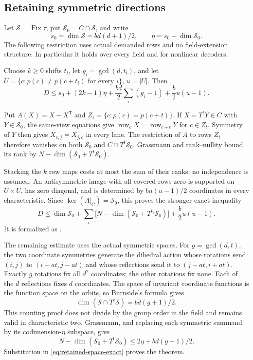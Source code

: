 \subsection{Retaining symmetric directions}

Let $\mathcal S=\operatorname{Fix}\tau$, put
$\mathcal S_0=C\cap\mathcal S$, and write
\[
 s_0=\dim\mathcal S=bd(d+1)/2,\qquad
 \eta=s_0-\dim\mathcal S_0.
\]
The following restriction uses actual demanded rows and no field-extension
structure. In particular it holds over every field and for nonlinear
decoders.

\begin{theorem}\label{thm:pairing-retention}
Choose $k\ge0$ shifts $t_i$, let $g_i=\gcd(d,t_i)$, and let
$U=\{c:p(c)\ne p(c+t_i)\text{ for every }i\}$, $u=|U|$. Then
\begin{equation}\label{eq:pairing-finite}
 D\le s_0+(2k-1)\eta+\frac{bd}{2}\sum_i(g_i-1)
                         +\frac b2u(u-1).
\end{equation}
\end{theorem}
\begin{outline}
Put $A(X)=X-X^{\mathsf T}$ and $Z_t=\{c:p(c)=p(c+t)\}$.
If $X=T^tY\in C$ with $Y\in\mathcal S_0$, the same-view equations give
$\operatorname{row}_cX=\operatorname{row}_{c+t}Y$ for $c\in Z_t$.
Symmetry of $Y$ then gives $X_{c,j}=X_{j,c}$ in every lane. The restriction
of $A$ to rows $Z_t$ therefore vanishes on both $\mathcal S_0$ and
$C\cap T^t\mathcal S_0$. Grassmann and rank--nullity bound its rank by
$N-\dim(\mathcal S_0+T^t\mathcal S_0)$.

Stacking the $k$ row maps costs at most the sum of their ranks; no
independence is assumed. An antisymmetric image with all covered rows zero
is supported on $U\times U$, has zero diagonal, and is determined by
$bu(u-1)/2$ coordinates in every characteristic. Since $\ker(A|_C)=\mathcal S_0$,
this proves the stronger exact inequality
\begin{equation}\label{eq:retained-space-exact}
 D\le\dim\mathcal S_0+
 \sum_i\bigl[N-\dim(\mathcal S_0+T^{t_i}\mathcal S_0)\bigr]
 +\frac b2u(u-1).
\end{equation}
It is formalized as .

The remaining estimate uses the actual symmetric spaces. For
$g=\gcd(d,t)$, the two coordinate symmetries generate the dihedral action
whose rotations send $(i,j)$ to $(i+at,j-at)$ and whose reflections send
it to $(j-at,i+at)$. Exactly $g$ rotations fix all $d^2$ coordinates;
the other rotations fix none. Each of the $d$ reflections fixes $d$
coordinates. The space of invariant coordinate functions is the function
space on the orbits, so Burnside's formula gives
\[
 \dim(\mathcal S\cap T^t\mathcal S)=bd(g+1)/2.
\]
This counting proof does not divide by the group order in the field and
remains valid in characteristic two. Grassmann, and replacing each
symmetric summand by its codimension-$\eta$ subspace, give
\[
 N-\dim(\mathcal S_0+T^t\mathcal S_0)\le2\eta+bd(g-1)/2.
\]
Substitution in \eqref{eq:retained-space-exact} proves the theorem.
\end{outline}

